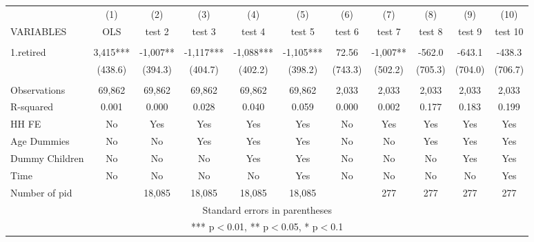 \begin{tabular}{lcccccccccc} \hline
 & (1) & (2) & (3) & (4) & (5) & (6) & (7) & (8) & (9) & (10) \\
VARIABLES & OLS & test 2 & test 3 & test 4 & test 5 & test 6 & test 7 & test 8 & test 9 & test 10 \\ \hline
 &  &  &  &  &  &  &  &  &  &  \\
1.retired & 3,415*** & -1,007** & -1,117*** & -1,088*** & -1,105*** & 72.56 & -1,007** & -562.0 & -643.1 & -438.3 \\
 & (438.6) & (394.3) & (404.7) & (402.2) & (398.2) & (743.3) & (502.2) & (705.3) & (704.0) & (706.7) \\
 &  &  &  &  &  &  &  &  &  &  \\
Observations & 69,862 & 69,862 & 69,862 & 69,862 & 69,862 & 2,033 & 2,033 & 2,033 & 2,033 & 2,033 \\
R-squared & 0.001 & 0.000 & 0.028 & 0.040 & 0.059 & 0.000 & 0.002 & 0.177 & 0.183 & 0.199 \\
HH FE & No & Yes & Yes & Yes & Yes & No & Yes & Yes & Yes & Yes \\
Age Dummies & No & No & Yes & Yes & Yes & No & No & Yes & Yes & Yes \\
Dummy Children & No & No & No & Yes & Yes & No & No & No & Yes & Yes \\
Time & No & No & No & No & Yes & No & No & No & No & Yes \\
 Number of pid &  & 18,085 & 18,085 & 18,085 & 18,085 &  & 277 & 277 & 277 & 277 \\ \hline
\multicolumn{11}{c}{ Standard errors in parentheses} \\
\multicolumn{11}{c}{ *** p$<$0.01, ** p$<$0.05, * p$<$0.1} \\
\end{tabular}
